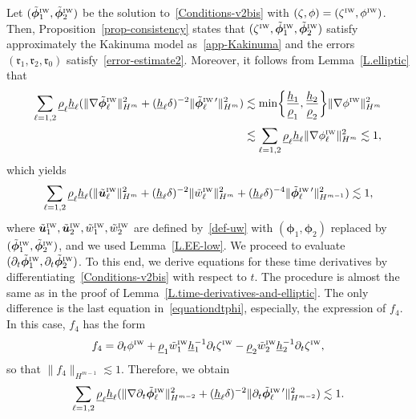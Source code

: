 \documentclass[11pt,leqno]{article}
\numberwithin{equation}{section}
\numberwithin{figure}{section}
\begin{document}
Let $(\tilde{\bm{\phi}}_1^{\mbox{\rm\tiny IW}},\tilde{\bm{\phi}}_2^{\mbox{\rm\tiny IW}})$ be the solution 
to~\eqref{Conditions-v2bis} with $(\zeta,\phi)=(\zeta^{\mbox{\rm\tiny IW}},\phi^{\mbox{\rm\tiny IW}})$. 
Then, Proposition~\ref{prop-consistency} states that 
$(\zeta^{\mbox{\rm\tiny IW}},\tilde{\bm{\phi}}_1^{\mbox{\rm\tiny IW}},\tilde{\bm{\phi}}_2^{\mbox{\rm\tiny IW}})$ satisfy 
approximately the Kakinuma model as~\eqref{app-Kakinuma} and the errors $(\bm{\mathfrak{r}}_1,\bm{\mathfrak{r}}_2,\mathfrak{r}_0)$ 
satisfy~\eqref{error-estimate2}. 
Moreover, it follows from Lemma~\ref{L.elliptic} that 
%
\begin{align*}
\sum_{\ell=1,2} \underline{\rho}_\ell \underline{h}_\ell
 ( \|\nabla\tilde{\bm{\phi}}_\ell^{\mbox{\rm\tiny IW}}\|_{H^m}^2
  + (\underline{h}_\ell\delta)^{-2}\|\tilde{\bm{\phi}}_\ell^{\mbox{\rm\tiny IW}\, \prime}\|_{H^m}^2 )
&\lesssim \min\biggl\{\frac{\underline{h}_1}{\underline{\rho}_1},\frac{\underline{h}_2}{\underline{\rho}_2} \biggr\}
 \|\nabla\phi^{\mbox{\rm\tiny IW}}\|_{H^m}^2 \\
&\lesssim \sum_{\ell=1,2} \underline{\rho}_\ell \underline{h}_\ell \|\nabla\phi_\ell^{\mbox{\rm\tiny IW}}\|_{H^m}^2 
\lesssim 1,
\end{align*}
%
which yields 
%
\[
\sum_{\ell=1,2} \underline{\rho}_\ell \underline{h}_\ell
 ( \|\tilde{\bm{u}}_\ell^{\mbox{\rm\tiny IW}}\|_{H^m}^2
  + (\underline{h}_\ell\delta)^{-2}\|\tilde{w}_\ell^{\mbox{\rm\tiny IW}}\|_{H^m}^2 
  + (\underline{h}_\ell\delta)^{-4}\|\tilde{\bm{\phi}}_\ell^{\mbox{\rm\tiny IW}\, \prime}\|_{H^{m-1}}^2 ) \lesssim 1,
\]
%
where $\tilde{\bm{u}}_1^{\mbox{\rm\tiny IW}}, \tilde{\bm{u}}_2^{\mbox{\rm\tiny IW}}, \tilde{w}_1^{\mbox{\rm\tiny IW}}, 
\tilde{w}_2^{\mbox{\rm\tiny IW}}$ are defined by~\eqref{def-uw} with $(\bm{\phi}_1,\bm{\phi}_2)$ replaced by 
$(\tilde{\bm{\phi}}_1^{\mbox{\rm\tiny IW}},\tilde{\bm{\phi}}_2^{\mbox{\rm\tiny IW}})$, and we used Lemma~\ref{L.EE-low}. 
We proceed to evaluate $(\partial_t\tilde{\bm{\phi}}_1^{\mbox{\rm\tiny IW}},\partial_t\tilde{\bm{\phi}}_2^{\mbox{\rm\tiny IW}})$. 
To this end, we derive equations for these time derivatives by differentiating~\eqref{Conditions-v2bis} with respect to $t$. 
The procedure is almost the same as in the proof of Lemma~\ref{L.time-derivatives-and-elliptic}. 
The only difference is the last equation in~\eqref{equationdtphi}, especially, the expression of $f_4$. 
In this case, $f_4$ has the form 
%
\[
f_4 = \partial_t\phi^{\mbox{\rm\tiny IW}}
 + \underline{\rho}_1\tilde{w}_1^{\mbox{\rm\tiny IW}}\underline{h}_1^{-1}\partial_t\zeta^{\mbox{\rm\tiny IW}}
 - \underline{\rho}_2\tilde{w}_2^{\mbox{\rm\tiny IW}}\underline{h}_2^{-1}\partial_t\zeta^{\mbox{\rm\tiny IW}},
\]
%
so that $\|f_4\|_{H^{m-1}} \lesssim 1$. 
Therefore, we obtain 
%
\[
\sum_{\ell=1,2} \underline{\rho}_\ell \underline{h}_\ell
 ( \|\nabla\partial_t\tilde{\bm{\phi}}_\ell^{\mbox{\rm\tiny IW}}\|_{H^{m-2}}^2
  + (\underline{h}_\ell\delta)^{-2}\|\partial_t\tilde{\bm{\phi}}_\ell^{\mbox{\rm\tiny IW}\, \prime}\|_{H^{m-2}}^2 ) \lesssim 1. 
\]
\end{document}

